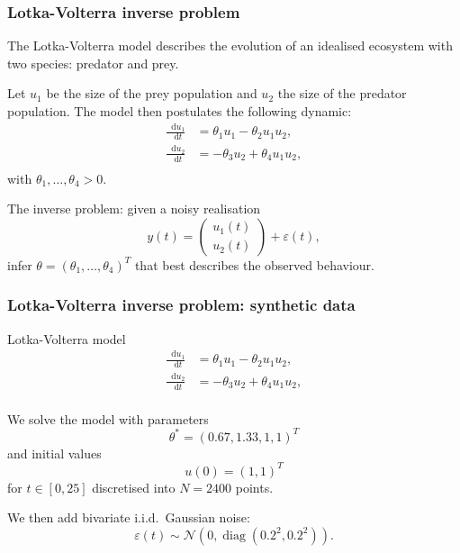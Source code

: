 \documentclass{beamer}
\newcommand*\diff{\mathop{}\!\mathrm{d}}
\DeclareMathOperator{\diag}{diag}
\begin{document}
\begin{frame}
\frametitle{Lotka-Volterra inverse problem}

The Lotka-Volterra model describes the evolution of an idealised ecosystem with two species: predator and prey.

Let $u_1$ be the size of the prey population and $u_2$ the size of the predator population. The model then postulates the following dynamic:
\begin{equation*}
\begin{aligned}
\frac{\diff u_1}{\diff t} & = \theta_1 u_1 - \theta_2 u_1 u_2, \\
\frac{\diff u_2}{\diff t} & = -\theta_3 u_2 + \theta_4 u_1 u_2, \\
\end{aligned}
\end{equation*}
with $\theta_1, \dots, \theta_4 > 0$.

The inverse problem: given a noisy realisation
\begin{equation*}
y(t) = \begin{pmatrix}
u_1(t) \\ u_2(t)
\end{pmatrix}
+ \varepsilon(t),
\end{equation*}
infer $\theta = (\theta_1, \dots, \theta_4)^T$ that best describes the observed behaviour.

\end{frame}



\begin{frame}
\frametitle{Lotka-Volterra inverse problem: synthetic data}

\begin{block}{Lotka-Volterra model}
\begin{equation*}
\begin{aligned}
\frac{\diff u_1}{\diff t} & = \theta_1 u_1 - \theta_2 u_1 u_2, \\
\frac{\diff u_2}{\diff t} & = -\theta_3 u_2 + \theta_4 u_1 u_2, \\
\end{aligned}
\end{equation*}
\end{block}

We solve the model with parameters
\begin{equation*}
\theta^* = (0.67, 1.33, 1, 1)^T
\end{equation*}
and initial values
\begin{equation*}
u(0) = (1, 1)^T
\end{equation*}
for $t \in [0, 25]$ discretised into $N = 2400$ points.

We then add bivariate i.i.d.\ Gaussian noise:
\begin{equation*}
\varepsilon(t) \sim \mathcal{N}(0, \diag(0.2^2, 0.2^2)).
\end{equation*}

\end{frame}
\end{document}
